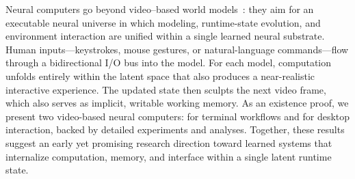 Neural computers go beyond video--based world models~\citep{ha2018world}: they aim for an executable neural universe in which modeling, runtime-state evolution, and environment interaction are unified within a single learned neural substrate.
%
Human inputs—keystrokes, mouse gestures, or natural-language commands—flow through a bidirectional I/O bus into the model.
%
For each model, computation unfolds entirely within the latent space that also produces a near-realistic interactive experience.
%
The updated state then sculpts the next video frame, which also serves as implicit, writable working memory.
%
As an existence proof, we present two video-based neural computers: \nccligen{} for terminal workflows and \ncguiworld{} for desktop interaction, backed by detailed experiments and analyses. Together, these results suggest an early yet promising research direction toward learned systems that internalize computation, memory, and interface within a single latent runtime state.

